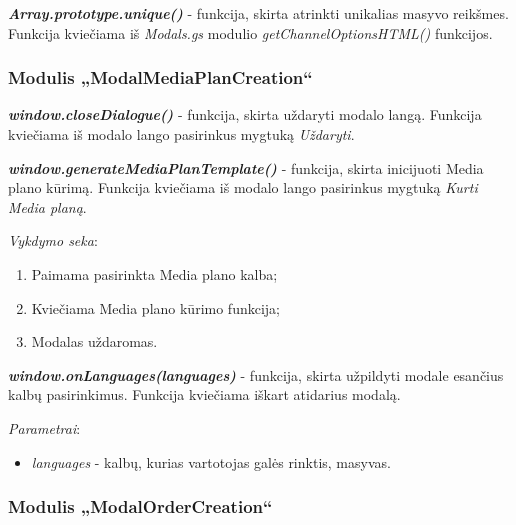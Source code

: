 \bigskip
\textit{\textbf{Array.prototype.unique()}} - funkcija, skirta atrinkti unikalias masyvo reikšmes. 
Funkcija kviečiama iš \textit{Modals.gs} modulio \textit{getChannelOptionsHTML()} funkcijos.



\subsubsection{Modulis „ModalMediaPlanCreation“}

\textit{\textbf{window.closeDialogue()}} - funkcija, skirta uždaryti modalo langą. Funkcija kviečiama iš modalo lango pasirinkus mygtuką \textit{Uždaryti}.

\bigskip
\textit{\textbf{window.generateMediaPlanTemplate()}} - funkcija, skirta inicijuoti Media plano kūrimą. Funkcija kviečiama iš modalo lango pasirinkus mygtuką \textit{Kurti Media planą}.

\bigskip
\textit{Vykdymo seka}:
\begin{enumerate}
    \itemsep0em 
    \item Paimama pasirinkta Media plano kalba;
    \item Kviečiama Media plano kūrimo funkcija;
    \item Modalas uždaromas.
\end{enumerate}

\bigskip
\textit{\textbf{window.onLanguages(languages)}} - funkcija, skirta užpildyti modale esančius kalbų pasirinkimus. Funkcija kviečiama iškart atidarius modalą.

\bigskip
\textit{Parametrai}:
\begin{itemize}
    \itemsep0em 
    \item \textit{languages} - kalbų, kurias vartotojas galės rinktis, masyvas.
\end{itemize}



\subsubsection{Modulis „ModalOrderCreation“}

